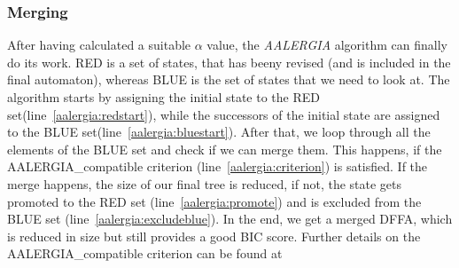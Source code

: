 \documentclass[
a4paper,
12pt
]{scrartcl}
\begin{document}
\subsubsection{Merging }

After having calculated a suitable $\alpha$ value, the \emph{AALERGIA} algorithm can finally do its work. RED is a set of states, that has beeny revised (and is included in the final automaton), whereas BLUE is the set of states that we need to look at. The algorithm starts by assigning the initial state to the RED set(line~\ref{aalergia:redstart}), while the successors of the initial state are assigned to the BLUE set(line~\ref{aalergia:bluestart}). After that, we loop through all the elements of the BLUE set and check if we can merge them. This happens, if the AALERGIA\_compatible criterion (line~\ref{aalergia:criterion}) is satisfied. If the merge happens, the size of our final tree is reduced, if not, the state gets promoted to the RED set (line~\ref{aalergia:promote}) and is excluded from the BLUE set (line~\ref{aalergia:excludeblue}). In the end, we get a merged DFFA, which is reduced in size but still provides a good BIC score. Further details on the AALERGIA\_compatible criterion can be found at \cite{Mao.}
\end{document}
